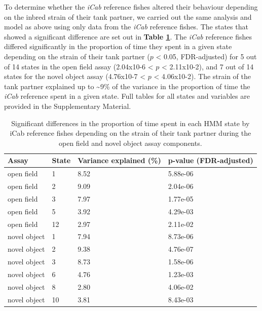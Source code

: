 \documentclass[
]{book}
\begin{document}
To determine whether the \emph{iCab} reference fishes altered their behaviour depending on the inbred strain of their tank partner, we carried out the same analysis and model as above using only data from the \emph{iCab} reference fishes. The states that showed a significant difference are set out in \textbf{Table \ref{tab:pilot-sge-tbl}}. The \emph{iCab} reference fishes differed significantly in the proportion of time they spent in a given state depending on the strain of their tank partner (\(p\) \textless{} 0.05, FDR-adjusted) for 5 out of 14 states in the open field assay (2.04x10-6 \textless{} \(p\) \textless{} 2.11x10-2), and 7 out of 14 states for the novel object assay (4.76x10-7 \textless{} \(p\) \textless{} 4.06x10-2). The strain of the tank partner explained up to \textasciitilde9\% of the variance in the proportion of time the \emph{iCab} reference spent in a given state. Full tables for all states and variables are provided in the Supplementary Material.

\begin{table}

\caption{\label{tab:pilot-sge-tbl}Significant differences in the proportion of time spent in each HMM state by iCab reference fishes depending on the strain of their tank partner during the open field and novel object assay components.}
\centering
\begin{tabular}[t]{llll}
\toprule
Assay & State & Variance explained (\%) & p-value (FDR-adjusted)\\
\midrule
open field & 1 & 8.52 & 5.88e-06\\
open field & 2 & 9.09 & 2.04e-06\\
open field & 3 & 7.97 & 1.77e-05\\
open field & 5 & 3.92 & 4.29e-03\\
open field & 12 & 2.97 & 2.11e-02\\
\addlinespace
novel object & 1 & 7.94 & 8.73e-06\\
novel object & 2 & 9.38 & 4.76e-07\\
novel object & 3 & 8.73 & 1.58e-06\\
novel object & 6 & 4.76 & 1.23e-03\\
novel object & 8 & 2.80 & 4.06e-02\\
\addlinespace
novel object & 10 & 3.81 & 8.43e-03\\
\bottomrule
\end{tabular}
\end{table}
\end{document}
